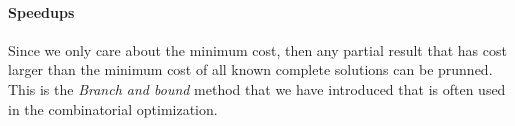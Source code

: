 \documentclass[../main.tex]{subfiles}
\begin{document}
\paragraph{Speedups} Since we only care about the minimum cost, then any partial result that has cost larger than the  minimum cost of all known complete solutions can be prunned. This is the \textit{Branch and bound} method that we have introduced that is often used in the combinatorial optimization. 
\end{document}
